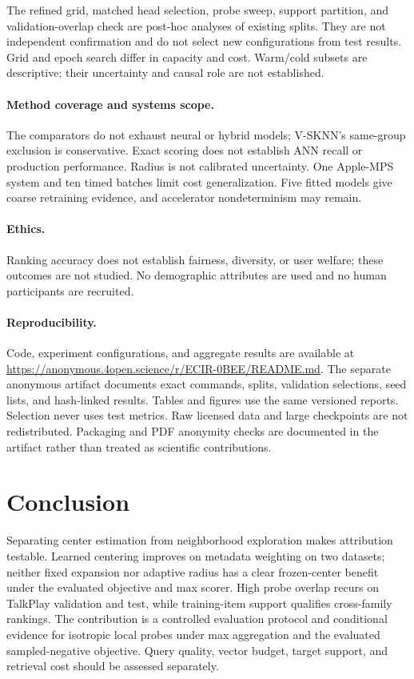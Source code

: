 \documentclass[runningheads]{llncs}
\begin{document}
The refined grid, matched head selection, probe sweep, support partition, and
validation-overlap check are post-hoc analyses of existing splits. They are
not independent confirmation and do not select new configurations from test
results. Grid and epoch search differ in capacity and cost. Warm/cold subsets
are descriptive; their uncertainty and causal role are not established.

\paragraph{Method coverage and systems scope.}
The comparators do not exhaust neural or hybrid models; V-SKNN's same-group
exclusion is conservative. Exact scoring does not establish ANN recall or
production performance. Radius is not calibrated uncertainty. One Apple-MPS
system and ten timed batches limit cost generalization. Five fitted models
give coarse retraining evidence, and accelerator nondeterminism may remain.

\paragraph{Ethics.}
Ranking accuracy does not establish fairness, diversity, or user welfare;
these outcomes are not studied. No demographic attributes are used and no
human participants are recruited.

\paragraph{Reproducibility.}
Code, experiment configurations, and aggregate results are available at
\url{https://anonymous.4open.science/r/ECIR-0BEE/README.md}.
The separate anonymous artifact documents exact commands, splits, validation selections,
seed lists, and hash-linked results. Tables and figures use the same versioned
reports. Selection never uses test metrics. Raw licensed data and large
checkpoints are not redistributed. Packaging and PDF anonymity checks are
documented in the artifact rather than treated as scientific contributions.

\section{Conclusion}
\label{sec:conclusion}

Separating center estimation from neighborhood exploration makes attribution
testable. Learned centering improves on metadata weighting on two datasets;
neither fixed expansion nor adaptive radius has a clear frozen-center benefit
under the evaluated objective and max scorer. High probe overlap recurs on
TalkPlay validation and test, while training-item support qualifies cross-family
rankings. The contribution is a controlled evaluation protocol and conditional
evidence for isotropic local probes under max aggregation and the evaluated
sampled-negative objective. Query quality, vector budget, target support, and
retrieval cost should be assessed separately.
\end{document}
